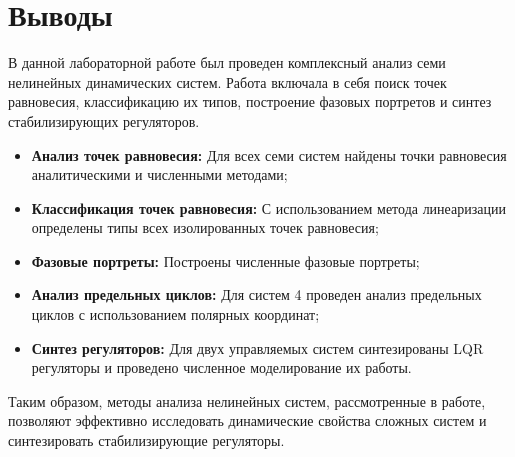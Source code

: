 \section*{Выводы}

В данной лабораторной работе был проведен комплексный анализ семи нелинейных динамических систем. Работа включала в себя поиск точек равновесия, классификацию их типов, построение фазовых портретов и синтез стабилизирующих регуляторов.

\begin{itemize}
\item \textbf{Анализ точек равновесия:} Для всех семи систем найдены точки равновесия аналитическими и численными методами;
\item \textbf{Классификация точек равновесия:} С использованием метода линеаризации определены типы всех изолированных точек равновесия;
\item \textbf{Фазовые портреты:} Построены численные фазовые портреты;
\item \textbf{Анализ предельных циклов:} Для систем 4 проведен анализ предельных циклов с использованием полярных координат;
\item \textbf{Синтез регуляторов:} Для двух управляемых систем синтезированы LQR регуляторы и проведено численное моделирование их работы.
\end{itemize}

Таким образом, методы анализа нелинейных систем, рассмотренные в работе, позволяют эффективно исследовать динамические свойства сложных систем и синтезировать стабилизирующие регуляторы.

